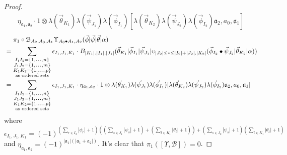 \begin{proof}
\begin{equation*}
\begin{aligned}
\eta_{\mathfrak{a}_1, \mathfrak{a}_2} \cdot
1 \otimes \lambda(\vec{\theta}_{K_1}) \lambda(\vec{\psi}_{J_1}) 
  \lambda(\vec{\phi}_{I_1})[
     \lambda(\vec{\theta}_{K_2}) \lambda(\vec{\psi}_{J_2}) 
     \lambda(\vec{\phi}_{I_2})
     \mathfrak{a}_2, a_0, \mathfrak{a}_1]    
\end{aligned}
\end{equation*}
%
\begin{align*}
& \phantom{{}={}}
\pi_1 \circ \mathcal{B}_{A_2, A_0, A_1} 
  \Upsilon_{A_0 \bullet A_1, A_2} 
  (\vec{\phi} | \vec{\psi} | \vec{\theta} | \alpha ) \\
&= 
\sum \limits_{\substack{
  I_1I_2 = \{1,\smdots,n\}\\
  J_1J_2 = \{1,\smdots,m\}\\
  K_1K_2 = \{1,\smdots,p\}\\
  \textrm{as ordered sets}}}
\epsilon_{I_1,J_1,K_1}\cdot
B_{|K_1|, |I_1|, |J_1|} 
   (\vec{\theta}_{K_1} | \vec{\phi}_{I_1} | \vec{\psi}_{J_1} | 
   \upsilon_{|J_2| \leq * \leq |I_2|+|J_2|, |K_2|} 
   (\vec{\phi}_{I_2} \bullet \vec{\psi}_{J_2} | \vec{\theta}_{K_2} | \alpha)) \\
&= 
\sum \limits_{\substack{
  I_1I_2 = \{1,\smdots,n\}\\
  J_1J_2 = \{1,\smdots,m\}\\
  K_1K_2 = \{1,\smdots,p\}\\
  \textrm{as ordered sets}}}
\epsilon_{I_1,J_1,K_1}\cdot
\eta_{\mathfrak{a}_1, \mathfrak{a}_2} \cdot
1 \otimes \lambda(\vec{\theta}_{K_1}) \lambda(\vec{\psi}_{J_1}) 
  \lambda(\vec{\phi}_{I_1})[
     \lambda(\vec{\theta}_{K_2}) \lambda(\vec{\psi}_{J_2}) 
     \lambda(\vec{\phi}_{I_2})
     \mathfrak{a}_2, a_0, \mathfrak{a}_1]  
\end{align*}
where $\epsilon_{I_1,J_1,K_1} = 
(-1)^{(\sum \limits_{r \in I_2}|\phi_r|+1)
  ((\sum \limits_{s \in J_1}|\psi_s|+1) + 
  (\sum \limits_{t \in K_1}|\theta_t|+1)) + 
  (\sum \limits_{s \in J_2}|\psi_s|+1)
  (\sum \limits_{t \in K_1}|\theta_t|+1)}$
and $\eta_{\mathfrak{a}_1, \mathfrak{a}_2} = 
(-1)^{|\mathfrak{a}_1|(|\mathfrak{a}_1+ 
\mathfrak{a}_2|)}$.
It's clear that $\pi_1([\Upsilon, \mathcal{B}]) = 0$.
\end{proof}